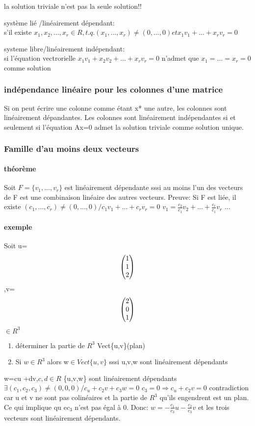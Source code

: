\documentclass[a4paper,10pt]{article}
\begin{document}
la solution triviale n'est pas la seule solution!!
\begin{description}
\item système lié /linéairement dépendant:\\{s'il existe $x_1,x_2,...,x_r\in R,t.q.(x_1,...,x_r)\neq(0,...,0) et x_1v_1+...+x_rv_r=0$}
\item systeme libre/linéairement indépendant:\\{si l'équation vectrorielle $x_1v_1+x_2v_2+...+x_rv_r=0$ n'admet que $x_1=...=x_r=0$ comme solution}
\end{description}
\subsubsection{indépendance linéaire pour les colonnes d'une matrice}
Si on peut écrire une colonne comme étant x* une autre, les colonnes sont linéairement dépandantes.
\newline
Les colonnes sont linéairement indépendantes si et seulement si l'équation Ax=0 admet la solution triviale comme solution unique.
\subsubsection{Famille d'au moins deux vecteurs}
\paragraph{théorème}
Soit $F=\{v_1,...,v_r\}$ est linéairement dépendante sssi au moins l'un des vecteurs de F est une combinaison linéaire des autres vecteurs.
\newline
Preuve:
\newline
Si F est liée, il existe $(c_1,...,c_r)\neq (0,...,0)/c_1v_1+...+c_rv_r=0$ $v_1=\frac{c_2}{c_1}v_2+...+\frac{c_r}{c_1}v_r$
...
\paragraph{exemple}
Soit u=
\[
\begin{pmatrix}
1\cr
1\cr
2\cr
\end{pmatrix}
\]
,v=
\[
\begin{pmatrix}
2\cr
0\cr
1\cr
\end{pmatrix}
\]
$\in R^3$
\begin{enumerate}
 \item déterminer la partie de $R^3$ Vect\{u,v\}(plan)
 \item Si $w\in R^3$ alors w$\in Vect\{u,v\}$ sssi u,v,w sont linéairement dépendants
\end{enumerate}
w=cu +dv,$c,d\in R$
\newline
\{u,v,w\} sont linéairement dépendants
\newline
$\exists(c_1,c_2,c_3)\neq(0,0,0)/c_u+c_2v+c_3w=0$
\newline
$c_3=0\Rightarrow c_u+c_2v=0$ contradiction car u et v ne sont pas colinéaires et la partie de $R^3$ qu'ils engendrent est un plan. Ce qui implique qu e$c_3$ n'est pas égal à 0.
\newline
Donc:
$w=-\frac{c_1}{c_3}u-\frac{c_2}{c_3}v$ et les trois vecteurs sont linéairement dépendants.
\end{document}
